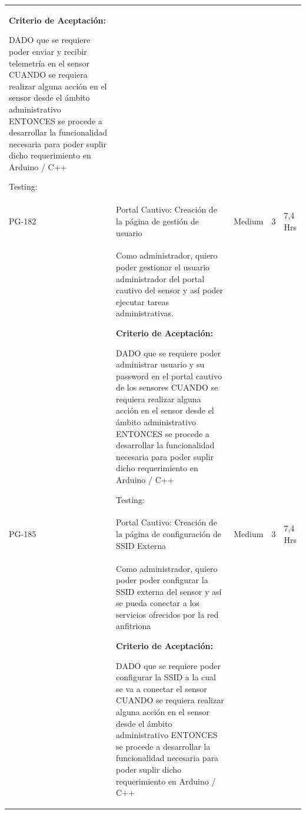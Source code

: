 \documentclass[11pt]{charter}
\begin{document}
\begin{landscape}
\begin{tabularx}{\linewidth}{@{}|p{1.3cm}|p{17cm}|p{1.7cm}|p{1.5cm}|p{1.7cm}|@{}}
\begin{description}
                   \item \textbf{Criterio de Aceptación:}                 
                   \item DADO que se requiere poder enviar y recibir telemetría en el sensor CUANDO se requiera realizar alguna acción en el sensor desde el ámbito   administrativo ENTONCES se procede a desarrollar la funcionalidad necesaria para poder   suplir dicho requerimiento en Arduino / C++                
                   \item Testing:
            \end{description}          &  &     & \\
PG-182   & Portal Cautivo: Creación de la   página de gestión de usuario      & Medium             & 3   & 7,4  Hrs          \\
         &  \begin{description}                 
                   \item Como administrador, quiero poder   gestionar el usuario administrador del portal cautivo del sensor y así poder   ejecutar tareas administrativas.                 
                   \item \textbf{Criterio de Aceptación:}                 
                   \item DADO que se requiere poder administrar usuario y su password en el portal   cautivo de los sensores CUANDO se requiera realizar alguna acción en el sensor desde el ámbito   administrativo ENTONCES se procede a desarrollar la funcionalidad necesaria para poder   suplir dicho requerimiento en Arduino / C++                
                   \item Testing:
            \end{description}  &  &     & \\
PG-185   & Portal Cautivo: Creación de la   página de configuración de SSID Externa             & Medium             & 3   & 7,4  Hrs          \\
         &  \begin{description}                 
                   \item Como administrador, quiero poder   poder configurar la SSID externa del sensor y así se pueda conectar a los   servicios ofrecidos por la red anfitriona                 
                   \item \textbf{Criterio de Aceptación:}                 
                   \item DADO que se requiere poder configurar la SSID a la cual se va a conectar el   sensor CUANDO se requiera realizar alguna acción en el sensor desde el ámbito   administrativo ENTONCES se procede a desarrollar la funcionalidad necesaria para poder   suplir dicho requerimiento en Arduino / C++                

\end{description}
\end{tabularx}
\end{landscape}
\end{document}
